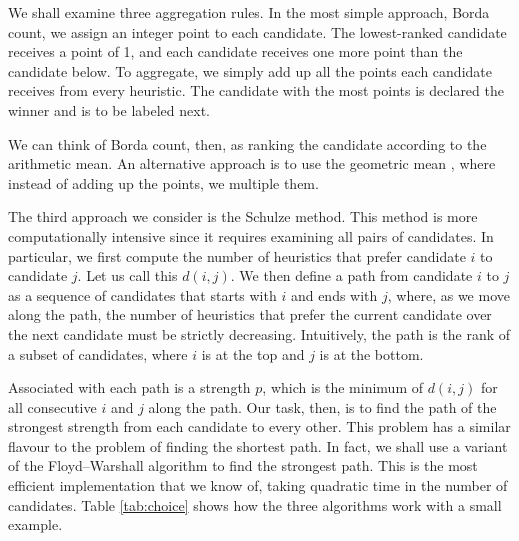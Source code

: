 \documentclass[fleqn,10pt,lineno]{wlpeerj} %
\begin{document}
We shall examine three aggregation rules. In the most simple approach, Borda
count, we assign an integer point to each candidate. The lowest-ranked
candidate receives a point of 1, and each candidate receives one more point
than the candidate below. To aggregate, we simply add up all the points each
candidate receives from every heuristic. The candidate with the most points
is declared the winner and is to be labeled next.

We can think of Borda count, then, as ranking the candidate according to the
arithmetic mean. An alternative approach is to use the geometric mean
\citep{bedo14}, where instead of adding up the points, we multiple them.

The third approach we consider is the Schulze method. This method is more
computationally intensive since it requires examining all pairs of candidates.
In particular, we first compute the number of heuristics that prefer
candidate $i$ to candidate $j$. Let us call this $d(i, j)$. We then define a
path from candidate $i$ to $j$ as a sequence of candidates that starts with $i$
and ends with $j$, where, as we move along the path, the number of heuristics
that prefer the current candidate over the next candidate must be strictly decreasing.
Intuitively, the path is the rank of a subset of candidates, where $i$ is at
the top and $j$ is at the bottom.

Associated with each path is a strength $p$, which is the minimum of $d(i, j)$
for all consecutive $i$ and $j$ along the path. Our task, then, is to find the
path of the strongest strength from each candidate to every other. This problem
has a similar flavour to the problem of finding the shortest path. In fact, we
shall use a variant of the Floyd–Warshall algorithm to find the strongest path.
This is the most efficient implementation that we know of, taking quadratic
time in the number of candidates. Table \ref{tab:choice} shows how the three
algorithms work with a small example.
\end{document}
